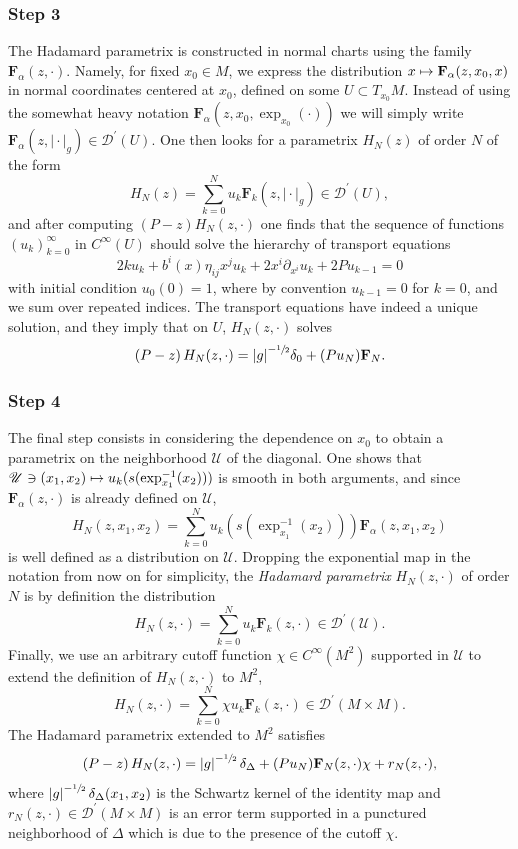 \documentclass[JEP,XML,SOM,Unicode]{cedram}
\let\pazocal\mathscr
\def\mto{\mathchoice{\longmapsto}{\mapsto}{\mapsto}{\mapsto}}
\theoremstyle{definition}
\newcommand\cU{{\pazocal U}}
\let\diag\Delta
\let\cv\alpha
\let\varalpha s
\newcommand\Cf{C^\infty}
\newcommand{\module}[1]{\left|#1\right|}
\renewcommand{\boxed}[1]{#1}
\newcommand\varvarm{{x_0}}
\newcommand{\Fe}[2][\cv]{\mathbf{F}_{#1}(#2, \cdot)}
\newcommand{\Feg}[2][\cv]{\mathbf{F}_{#1}(#2, \vert {\cdot} \vert_g)}
\begin{document}
\subsubsection*{Step 3} The Hadamard parametrix is constructed in normal charts using the family $\Fe{z}$. Namely, for fixed
$\varvarm\in M$, we express the distribution $x\mto \mathbf{F}_\cv(z,\varvarm,x)$
in normal coordinates centered at $\varvarm$, defined on some $U\subset T_{x_0}{M}$. Instead of using the somewhat heavy notation $ \mathbf{F}_\cv(z,\varvarm,\exp_\varvarm(\cdot))$ we will simply write
$\Feg{z}\in \pazocal{D}^\prime(U)$. One then looks for a parametrix $H_N(z)$ of order $N$ of the form
\[
\boxed{H_N(z)=\sum_{k=0}^N u_k \Feg[k]{z} \in \pazocal{D}^\prime(U) },
\]
and after computing $\left(P-z\right)H_N(z,\cdot)$ one finds that the sequence of functions
$(u_k)_{k=0}^\infty$ in $C^\infty(U)$ should solve the hierarchy of transport equations
\[
\boxed{2k u_k+ b^i(x)\eta_{ij}x^j u_k+2 x^i\partial_{x^i} u_k+2Pu_{k-1}=0}
\]
with initial condition $u_0(0)=1$, where by convention $u_{k-1}=0$ for $k=0$, and we sum over repeated indices. The transport equations have indeed a unique solution, and they imply that on $U$, $H_N(z,\cdot)$ solves
\[
\left(P-z\right)H_N(z,\cdot)={\module{g}^{-\sfrac{1}{2}}}\delta_0+(Pu_N)\mathbf{F}_N.
\]

\subsubsection*{Step 4} The final step consists in considering the dependence on $x_0$ to obtain a parametrix on the neighborhood $\cU$ of the diagonal. One shows that $\pazocal{U} \ni (x_1,x_2) \mto u_k(\varalpha(\exp_{x_1}^{-1}(x_2))) $ is smooth in both arguments, and since $\mathbf{F}_{\cv}(z,\cdot)$ is already defined on $\pazocal{U}$,
\[
H_N(z,x_1,x_2)=\sum_{k=0}^N u_k(\varalpha(\exp_{x_1}^{-1}(x_2)))\mathbf{F}_\cv(z,x_1,x_2)
\]
is well defined as a distribution on $\pazocal{U}$.
Dropping the exponential map in the notation from now on for simplicity, the \emph{Hadamard parametrix} $H_N(z,\cdot)$ of order $N$ is by definition the distribution
\[
\boxed{H_N(z,\cdot)=\sum_{k=0}^N u_k \Fe[k]{z}\in \pazocal{D}^\prime(\pazocal{U}).}
\]
Finally, we use an arbitrary cutoff function $\chi\in \Cf(M^2)$ supported in $\pazocal{U}$ to extend the definition of $H_N(z,\cdot)$ to $M^2$,
\[
\boxed{H_N(z,\cdot)=\sum_{k=0}^N \chi u_k \Fe[k]{z}\in \pazocal{D}^\prime({M\times M}).}
\]
The Hadamard parametrix extended to $M^2$ satisfies
\begin{equation}\label{eq:PzHN}
\left(P-z\right) H_N(z,\cdot)=\module{g}^{-\sfrac{1}{2}}\delta_{\diag}+(Pu_N)\mathbf{F}_N(z,\cdot)\chi+r_N(z,\cdot),
\end{equation}
where
$\module{g}^{-\sfrac{1}{2}}\delta_\Delta(x_1,x_2)$ is the Schwartz kernel of the identity map and $r_N(z,\cdot)\in \pazocal{D}^\prime({M\times M})$ is an error term supported in a punctured neighborhood of $\Delta$ which is due to the presence of the cutoff $\chi$.
\end{document}
